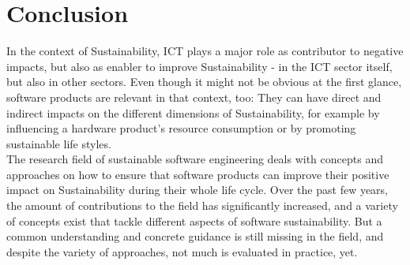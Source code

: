 \section{Conclusion}
In the context of Sustainability, ICT plays a major role as contributor to negative impacts, but also as enabler to improve Sustainability - in the ICT sector itself, but also in other sectors. Even though it might not be obvious at the first glance, software products are relevant in that context, too: They can have direct and indirect impacts on the different dimensions of Sustainability, for example by influencing a hardware product's resource consumption or by promoting sustainable life styles.\\
The research field of sustainable software engineering deals with concepts and approaches on how to ensure that software products can improve their positive impact on Sustainability during their whole life cycle. Over the past few years, the amount of contributions to the field has significantly increased, and a variety of concepts exist that tackle different aspects of software sustainability. But a common understanding and concrete guidance is still missing in the field, and despite the variety of approaches, not much is evaluated in practice, yet.

